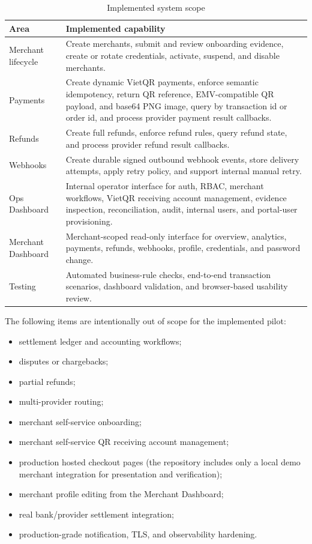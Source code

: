 \begin{table}[!htbp]
\centering
\caption{Implemented system scope}
\begin{tabularx}{\textwidth}{L{0.24\textwidth}Y}
\toprule
\textbf{Area} & \textbf{Implemented capability} \\
\midrule
Merchant lifecycle & Create merchants, submit and review onboarding evidence, create or rotate credentials, activate, suspend, and disable merchants. \\
\bodyrowrule
Payments & Create dynamic VietQR payments, enforce semantic idempotency, return QR reference, EMV-compatible QR payload, and base64 PNG image, query by transaction id or order id, and process provider payment result callbacks. \\
\bodyrowrule
Refunds & Create full refunds, enforce refund rules, query refund state, and process provider refund result callbacks. \\
\bodyrowrule
Webhooks & Create durable signed outbound webhook events, store delivery attempts, apply retry policy, and support internal manual retry. \\
\bodyrowrule
Ops Dashboard & Internal operator interface for auth, RBAC, merchant workflows, VietQR receiving account management, evidence inspection, reconciliation, audit, internal users, and portal-user provisioning. \\
\bodyrowrule
Merchant Dashboard & Merchant-scoped read-only interface for overview, analytics, payments, refunds, webhooks, profile, credentials, and password change. \\
\bodyrowrule
Testing & Automated business-rule checks, end-to-end transaction scenarios, dashboard validation, and browser-based usability review. \\
\bottomrule
\end{tabularx}
\end{table}

The following items are intentionally out of scope for the implemented pilot:

\begin{itemize}
  \item settlement ledger and accounting workflows;
  \item disputes or chargebacks;
  \item partial refunds;
  \item multi-provider routing;
  \item merchant self-service onboarding;
  \item merchant self-service QR receiving account management;
  \item production hosted checkout pages (the repository includes only a local
  demo merchant integration for presentation and verification);
  \item merchant profile editing from the Merchant Dashboard;
  \item real bank/provider settlement integration;
  \item production-grade notification, TLS, and observability hardening.
\end{itemize}

